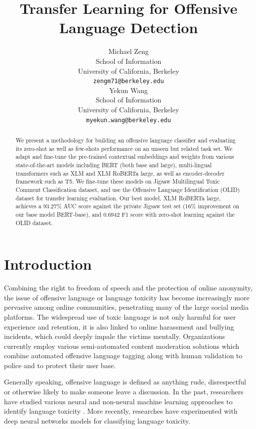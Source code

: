 \documentclass[11pt,a4paper]{article}
\title{Transfer Learning for Offensive Language Detection}
\author{Michael Zeng\\
  School of Information\\
  University of California, Berkeley \\
  {\tt zengm71@berkeley.edu} \\\And
  Yekun  Wang\\
  School of Information\\
  University of California, Berkeley \\
  {\tt myekun.wang@berkeley.edu} \\}
\date{}
\begin{document}
\maketitle
\begin{abstract}
We present a methodology for building an offensive language classifier and evaluating its zero-shot as well as few-shots performance on an unseen but related task set. We adapt and fine-tune the pre-trained contextual embeddings and weights from various state-of-the-art models including BERT (both base and large), multi-lingual transformers such as XLM and XLM RoBERTa large, as well as encoder-decoder framework such as T5. We fine-tune these models on Jigsaw Multilingual Toxic Comment Classification dataset, and use the Offensive Language Identification (OLID) dataset  for transfer learning evaluation. Our best model, XLM RoBERTa large, achieves a 93.27\% AUC score against the private Jigsaw test set (16\% improvement on our base model BERT-base), and 0.6942 F1 score with zero-shot learning against the OLID dataset.

\end{abstract}

\section{Introduction}
Combining the right to freedom of speech and the protection of online anonymity, the issue of offensive language or language toxicity has become increasingly more pervasive among online communities, penetrating many of the large social media platforms. The widespread use of toxic language is not only harmful for user experience and retention, it is also linked to online harassment and bullying incidents, which could deeply impale the victims mentally. Organizations currently employ various semi-automated content moderation solutions which combine automated offensive language tagging along with human validation to police and to protect their user base. 

Generally speaking, offensive language is defined as anything rude, disrespectful or otherwise likely to make someone leave a discussion. In the past, researchers have studied various neural and non-neural machine learning approaches to identify language toxicity \citep{schmidt-wiegand-2017-survey}. More recently, researches have experimented with deep neural networks models for classifying language toxicity. 
\end{document}
